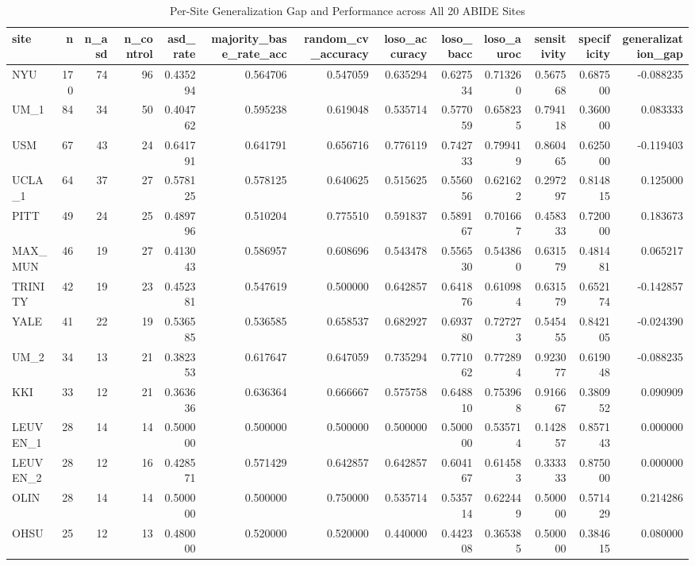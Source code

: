 \begin{table}
\caption{Per-Site Generalization Gap and Performance across All 20 ABIDE Sites}
\label{tab:site_gaps}
\begin{tabular}{lrrrrrrrrrrrr}
\toprule
site & n & n_asd & n_control & asd_rate & majority_base_rate_acc & random_cv_accuracy & loso_accuracy & loso_bacc & loso_auroc & sensitivity & specificity & generalization_gap \\
\midrule
NYU & 170 & 74 & 96 & 0.435294 & 0.564706 & 0.547059 & 0.635294 & 0.627534 & 0.713260 & 0.567568 & 0.687500 & -0.088235 \\
UM_1 & 84 & 34 & 50 & 0.404762 & 0.595238 & 0.619048 & 0.535714 & 0.577059 & 0.658235 & 0.794118 & 0.360000 & 0.083333 \\
USM & 67 & 43 & 24 & 0.641791 & 0.641791 & 0.656716 & 0.776119 & 0.742733 & 0.799419 & 0.860465 & 0.625000 & -0.119403 \\
UCLA_1 & 64 & 37 & 27 & 0.578125 & 0.578125 & 0.640625 & 0.515625 & 0.556056 & 0.621622 & 0.297297 & 0.814815 & 0.125000 \\
PITT & 49 & 24 & 25 & 0.489796 & 0.510204 & 0.775510 & 0.591837 & 0.589167 & 0.701667 & 0.458333 & 0.720000 & 0.183673 \\
MAX_MUN & 46 & 19 & 27 & 0.413043 & 0.586957 & 0.608696 & 0.543478 & 0.556530 & 0.543860 & 0.631579 & 0.481481 & 0.065217 \\
TRINITY & 42 & 19 & 23 & 0.452381 & 0.547619 & 0.500000 & 0.642857 & 0.641876 & 0.610984 & 0.631579 & 0.652174 & -0.142857 \\
YALE & 41 & 22 & 19 & 0.536585 & 0.536585 & 0.658537 & 0.682927 & 0.693780 & 0.727273 & 0.545455 & 0.842105 & -0.024390 \\
UM_2 & 34 & 13 & 21 & 0.382353 & 0.617647 & 0.647059 & 0.735294 & 0.771062 & 0.772894 & 0.923077 & 0.619048 & -0.088235 \\
KKI & 33 & 12 & 21 & 0.363636 & 0.636364 & 0.666667 & 0.575758 & 0.648810 & 0.753968 & 0.916667 & 0.380952 & 0.090909 \\
LEUVEN_1 & 28 & 14 & 14 & 0.500000 & 0.500000 & 0.500000 & 0.500000 & 0.500000 & 0.535714 & 0.142857 & 0.857143 & 0.000000 \\
LEUVEN_2 & 28 & 12 & 16 & 0.428571 & 0.571429 & 0.642857 & 0.642857 & 0.604167 & 0.614583 & 0.333333 & 0.875000 & 0.000000 \\
OLIN & 28 & 14 & 14 & 0.500000 & 0.500000 & 0.750000 & 0.535714 & 0.535714 & 0.622449 & 0.500000 & 0.571429 & 0.214286 \\
OHSU & 25 & 12 & 13 & 0.480000 & 0.520000 & 0.520000 & 0.440000 & 0.442308 & 0.365385 & 0.500000 & 0.384615 & 0.080000 \\

\end{tabular}
\end{table}
